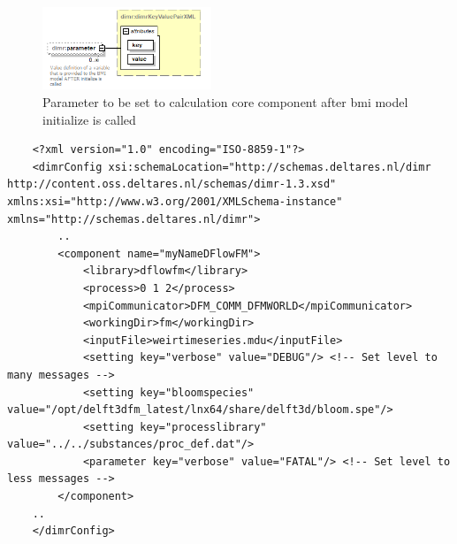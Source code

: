 \documentclass[signature]{deltares_manual}
\begin{document}
\begin{figure}[H]
	\centering
	\includegraphics[width=0.45\textwidth] {pictures/dimr_diagrams/dimr_p9.png}
	\caption{Parameter to be set to calculation core component after bmi model initialize is called} 
	\label{fig:dimrComponentParameter}
\end{figure}

\begin{lstlisting}
	<?xml version="1.0" encoding="ISO-8859-1"?>
	<dimrConfig xsi:schemaLocation="http://schemas.deltares.nl/dimr http://content.oss.deltares.nl/schemas/dimr-1.3.xsd" xmlns:xsi="http://www.w3.org/2001/XMLSchema-instance" xmlns="http://schemas.deltares.nl/dimr">
		..
		<component name="myNameDFlowFM">
			<library>dflowfm</library>
			<process>0 1 2</process>
			<mpiCommunicator>DFM_COMM_DFMWORLD</mpiCommunicator>
			<workingDir>fm</workingDir>
			<inputFile>weirtimeseries.mdu</inputFile>
			<setting key="verbose" value="DEBUG"/> <!-- Set level to many messages -->
			<setting key="bloomspecies" value="/opt/delft3dfm_latest/lnx64/share/delft3d/bloom.spe"/>
			<setting key="processlibrary" value="../../substances/proc_def.dat"/>
			<parameter key="verbose" value="FATAL"/> <!-- Set level to less messages -->
		</component>
	..
	</dimrConfig>
\end{lstlisting}
\end{document}
